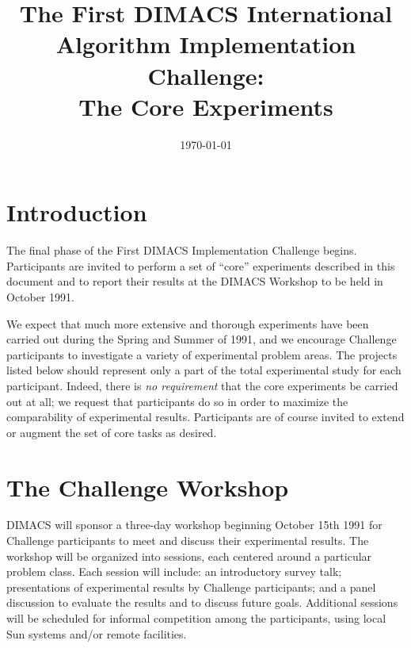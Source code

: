 \setlength{\topmargin}{-.5in}
\addtolength{\textheight}{1.5in}
\addtolength{\textwidth}{\evensidemargin}
\addtolength{\textwidth}{\oddsidemargin}
\setlength{\oddsidemargin}{.25in}
\setlength{\evensidemargin}{.25in}
\addtolength{\textwidth}{-1.0\oddsidemargin}
\addtolength{\textwidth}{-1.0\evensidemargin}

\setlength{\baselineskip}{14pt}

\title{\Large The First DIMACS International \\
Algorithm Implementation Challenge: \\ The Core Experiments}
\author{}
\date{{\small \today}}
\maketitle

\section{Introduction} 
The final phase of the First DIMACS Implementation Challenge begins.
Participants are invited to perform a set of ``core'' experiments
described in this document and to report their results at the DIMACS
Workshop to be held in October 1991.

We expect that much more extensive and thorough experiments have been
carried out during the Spring and Summer of 1991, and we encourage
Challenge participants to investigate a variety of experimental
problem areas.  The projects listed below should represent only a part
of the total experimental study for each participant.  Indeed, there
is {\em no requirement} that the core experiments be carried out at
all; we request that participants do so in order to maximize the
comparability of experimental results.  Participants are of course
invited to extend or augment the set of core tasks as desired.

\section{The Challenge Workshop} 

DIMACS will sponsor a three-day workshop beginning October 15th 1991
for Challenge participants to meet and discuss their experimental
results.  The workshop will be organized into sessions, each centered
around a particular problem class.  Each session will include: an
introductory survey talk; presentations of experimental results by
Challenge participants; and a panel discussion to evaluate the results
and to discuss future goals.  Additional sessions will be scheduled
for informal competition among the participants, using local Sun
systems and/or remote facilities.

